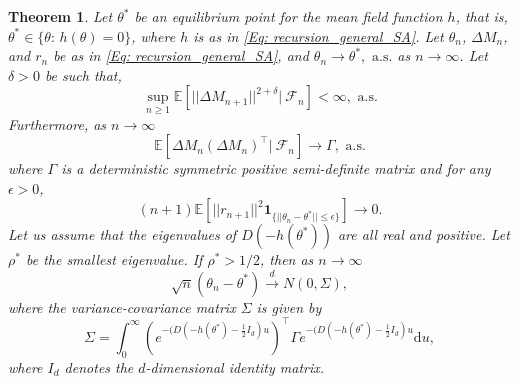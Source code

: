 \documentclass{article}
\numberwithin{equation}{section}
\newtheorem{theorem}{Theorem}[section]
\newcommand{\FF}{\mbox{${\mathcal F}$}}
\newcommand{\1}{\mathbf{1}}
\newcommand{\0}{\mathbf{0}}
\newcommand{\E}{\mbox{${\mathbb E}$}}
\begin{document}
\begin{theorem}
\label{Thm: CLT_SA_eigenvalue_more_than_half}
 Let $\theta^*$ be an equilibrium point for the mean field function $h$, that is, $\theta^* \in \{\theta: \, h(\theta)=0\}$, where $h$ is as in \eqref{Eq: recursion_general_SA}. Let $\theta_n$, $\Delta M_n$, and $r_n$ be as in \eqref{Eq: recursion_general_SA}, and $\theta_n \longrightarrow \theta^*, \text{ a.s.}$ as $n \to \infty$. Let $\delta>0$ be such that,
\begin{equation}\label{eq: SA CLT cond1 rho>1/2}
    \sup_{n \ge 1}\E \left[\lvert \lvert \Delta M_{n+1}\rvert \rvert ^{2+\delta} | \ \FF_{n}\right]< \infty, \text{ a.s.}
\end{equation}
Furthermore, as $n \to \infty$
\begin{equation}\label{eq: SA CLT cond2 rho>1/2}
\E \left[ \Delta M_n \left( \Delta M_n \right)^\top | \ \FF_{n}\right] \longrightarrow \Gamma, \text{ a.s.}
\end{equation}
where $\Gamma$ is a deterministic symmetric positive semi-definite matrix and for any $\epsilon>0$, 
\begin{equation}
\label{Eq: error_for_second_eigenvalue_leq_1/2}
(n+1)\E\left[\lvert \lvert r_{n+1} \rvert \rvert ^2 \mathbf{1}_{\{\lvert \lvert \theta_n - \theta^*\rvert \rvert \le \epsilon\}} \right] \longrightarrow 0.
\end{equation}
Let us assume that the eigenvalues of $D(-h(\theta^*))$ are all real and positive. Let $\rho^{*}$ be the smallest eigenvalue. If $\rho^{*} >1/2$, then as $n \to \infty$ 
\begin{equation}
\label{Eq: CLT_second_eigenvalue_leq_1/2}
\sqrt{n}\left(\theta_n - \theta^*\right)\stackrel{d}{\longrightarrow} N(0, \Sigma),
\end{equation}
where the variance-covariance matrix $\Sigma$ is given by 
\begin{equation}
\label{Eq: variance_covariance_matrix_eigenvalue_more_than_half}
\Sigma = \int_{0}^{\infty}{\left(e^{-(D(-h(\theta^*)-\frac{1}{2}I_d) u}\right)^\top \Gamma e^{-(D(-h(\theta^*)-\frac{1}{2}I_d) u} \mathrm{d}u},
\end{equation}
where $I_d$ denotes the $d$-dimensional identity matrix.
\end{theorem}
\end{document}
